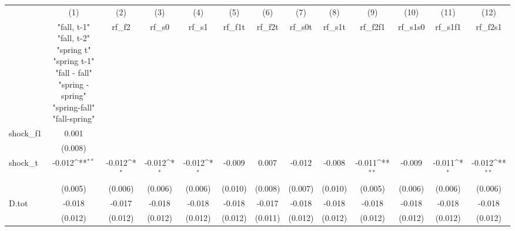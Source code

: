 {
\def\sym#1{\ifmmode^{#1}\else\(^{#1}\)\fi}
\begin{tabular}{l*{12}{c}}
\toprule
            &\multicolumn{1}{c}{(1)}&\multicolumn{1}{c}{(2)}&\multicolumn{1}{c}{(3)}&\multicolumn{1}{c}{(4)}&\multicolumn{1}{c}{(5)}&\multicolumn{1}{c}{(6)}&\multicolumn{1}{c}{(7)}&\multicolumn{1}{c}{(8)}&\multicolumn{1}{c}{(9)}&\multicolumn{1}{c}{(10)}&\multicolumn{1}{c}{(11)}&\multicolumn{1}{c}{(12)}\\
            &\multicolumn{1}{c}{  "fall, t-1" "fall, t-2" "spring t" "spring t-1"  "fall - fall" "spring - spring" "spring-fall" "fall-spring" }&\multicolumn{1}{c}{rf\_f2}&\multicolumn{1}{c}{rf\_s0}&\multicolumn{1}{c}{rf\_s1}&\multicolumn{1}{c}{rf\_f1t}&\multicolumn{1}{c}{rf\_f2t}&\multicolumn{1}{c}{rf\_s0t}&\multicolumn{1}{c}{rf\_s1t}&\multicolumn{1}{c}{rf\_f2f1}&\multicolumn{1}{c}{rf\_s1s0}&\multicolumn{1}{c}{rf\_s1f1}&\multicolumn{1}{c}{rf\_f2s1}\\
\midrule
shock\_f1    &       0.001         &                     &                     &                     &                     &                     &                     &                     &                     &                     &                     &                     \\
            &     (0.008)         &                     &                     &                     &                     &                     &                     &                     &                     &                     &                     &                     \\
\addlinespace
shock\_t     &      -0.012\sym{**} &      -0.012\sym{*}  &      -0.012\sym{*}  &      -0.012\sym{*}  &      -0.009         &       0.007         &      -0.012         &      -0.008         &      -0.011\sym{**} &      -0.009         &      -0.011\sym{*}  &      -0.012\sym{**} \\
            &     (0.005)         &     (0.006)         &     (0.006)         &     (0.006)         &     (0.010)         &     (0.008)         &     (0.007)         &     (0.010)         &     (0.005)         &     (0.006)         &     (0.006)         &     (0.006)         \\
\addlinespace
D.tot       &      -0.018         &      -0.017         &      -0.018         &      -0.018         &      -0.018         &      -0.017         &      -0.018         &      -0.018         &      -0.018         &      -0.018         &      -0.018         &      -0.018         \\
            &     (0.012)         &     (0.012)         &     (0.012)         &     (0.012)         &     (0.012)         &     (0.011)         &     (0.012)         &     (0.012)         &     (0.012)         &     (0.012)         &     (0.012)         &     (0.012)         \\

\end{tabular}}
